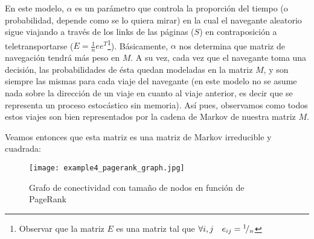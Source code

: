 \par En este modelo, $\alpha$ es un par\'ametro que controla la proporci\'on del
tiempo (o probabilidad, depende como se lo quiera mirar) en la cual el navegante
aleatorio sigue viajando a trav\'es de los links de las p\'aginas ($S$)
en contraposici\'on a teletransportarse ($E = \frac{1}{n}ee^T$\footnote{Observar
que la matriz $E$ es una matriz tal que $\forall i,j \quad e_{ij} =
{}^{1}\!/_{n}$}). B\'asicamente, $\alpha$ nos determina que matriz de
navegaci\'on tendr\'a m\'as peso en $M$. A su vez, cada vez que el navegante
toma una decisi\'on, las probabilidades de \'esta quedan modeladas en la
matriz $M$, y son siempre las mismas para cada viaje del navegante (en este modelo
no se asume nada sobre la direcci\'on de un viaje en cuanto al viaje anterior,
es decir que se representa un proceso estoc\'astico sin memoria). As\'i pues,
observamos como todos estos viajes son bien representados por la cadena de
Markov de nuestra matriz $M$.

\par Veamos entonces que esta matriz es una matriz de Markov irreducible y
cuadrada:

\begin{wrapfigure}[23]{l}{0.5\textwidth}
    \vspace{10pt}
    \centering
    \texttt{[image: example4\_pagerank\_graph.jpg]}
    \caption{Grafo de conectividad con tama\~no de nodos en funci\'on de
        PageRank~\cite{wiki_pagerank}}
\end{wrapfigure}
\leavevmode

